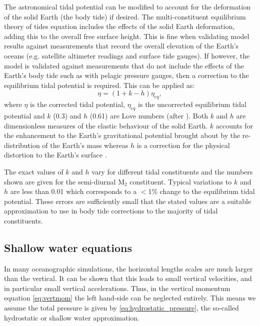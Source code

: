 The astronomical tidal potential can be modified to account for the deformation of the solid Earth
(the body tide) if desired. The multi-constituent equilibrium theory of tides equation includes the effects of the
solid Earth deformation, adding this to the overall free surface height.
This is fine
when validating model results against measurements that record the overall elevation of the
Earth's oceans (e.g. satellite altimeter readings and surface tide gauges). If however, the model
is validated against measurements that do not include the effects of the Earth's body tide
such as with pelagic pressure gauges, then a correction to the equilibrium tidal potential
is required. This can be applied as:
\begin{equation}
\eta=(1+k-h)\eta_{eq},
\label{eq:body-tide}
\end{equation}
where $\eta$ is the corrected tidal potential, $\eta_{eq}$ is the uncorrected equilibrium tidal potential
and $k$ (0.3) and $h$ (0.61) are Love numbers (after \citealp{Love1909}).
Both $k$ and $h$ are dimensionless measures of the elastic behaviour of the solid Earth. $k$ accounts for the enhancement to the
Earth's gravitational potential brought about by the re-distribution of the Earth's mass whereas $h$
is a correction for the physical distortion to the Earth's surface \citep{Pugh1987}.

The exact values of $k$ and $h$ vary for different tidal constituents and the numbers shown are given
for the semi-diurnal M$_{\text{2}}$ constituent. Typical variations to $k$ and $h$ are less than 0.01 which
corresponds to a $<$1\% change to the equilibrium tidal potential.
These errors are sufficiently small that the stated values are a suitable approximation to
use in body tide corrections to the majority of tidal constituents.

\subsection{Shallow water equations}
In many oceanographic simulations, the horizontal lengths scales are much larger
than the vertical. It can be shown that this leads to small vertical velocities,
and in particular small vertical accelerations. Thus, in the vertical momentum
equation \eqref{eq:vertmom} the left hand-side can be neglected entirely. This
means we assume the total pressure is given by \eqref{eq:hydrostatic_pressure},
the so-called hydrostatic or shallow water approximation.

